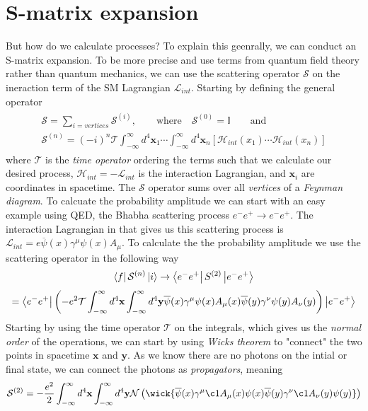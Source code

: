 \documentclass[12pt, a4paper]{book}
\begin{document}
\section{S-matrix expansion}
But how do we calculate processes? To explain this geenrally, we can conduct an S-matrix expansion. To be more precise and use terms from quantum field theory rather than quantum mechanics, we can use the scattering operator $\mathcal{S}$ on the ineraction 
term of the SM Lagrangian $\mathcal{L}_{int}$. Starting by defining the general operator
\begin{align}\label{eq:S-matrix}
    \begin{split}
        \mathcal{S} = \sum_{i = vertices}\mathcal{S}^{(i)},\qquad\text{where}\quad \mathcal{S}^{(0)} = \mathbb{I}\qquad\text{and}\quad \\
        \mathcal{S}^{(n)}=(-i)^n\mathcal{T}\int_{-\infty}^{\infty}d^4\mathbf{x}_1\cdots\int_{-\infty}^{\infty}d^4\mathbf{x}_n\left[\mathcal{H}_{int}(x_1)\cdots\mathcal{H}_{int}(x_n)\right]
    \end{split}
\end{align}
where $\mathcal{T}$ is the \textit{time operator} ordering the terms such that we calculate our desired process, $\mathcal{H}_{int}=-\mathcal{L}_{int}$ is the interaction Lagrangian, and $\mathbf{x}_i$ are coordinates in spacetime.  The $\mathcal{S}$ operator sums over all \textit{vertices} 
of a \textit{Feynman diagram}. To calcuate the probability amplitude we can start with an easy example using QED, the Bhabha scattering process $e^- e^+\rightarrow e^-e^+$. The interaction Lagrangian in that gives us this scattering process is 
$\mathcal{L}_{int} = e\overline{\psi}(x)\gamma^\mu\psi(x)A_\mu$. To calculate the the probability amplitude we use the scattering operator in the following way
$$
\bra{f}\mathcal{S}^{(n)}\ket{i} \rightarrow \bra{e^-e^+}S^{(2)}\ket{e^-e^+} 
$$
$$
= \bra{e^-e^+}\left(-e^2\mathcal{T}\int_{-\infty}^{\infty}d^4\mathbf{x} \int_{-\infty}^{\infty}d^4\mathbf{y} \overline{\psi}(x)\gamma^\mu\psi(x)A_\mu(x)\overline{\psi}(y)\gamma^\nu\psi(y)A_\nu(y) \right)\ket{e^-e^+}
$$
Starting by using the time operator $\mathcal{T}$ on the integrals, which gives us the \textit{normal order} of the operations, we can start by using \textit{Wicks theorem} to "connect" the two points in spacetime $\mathbf{x}$ and $\mathbf{y}$. As we know there are no photons on the intial or final state, we can connect the photons as \textit{propagators}, meaning
$$
\mathcal{S}^{(2)} = -\frac{e^2}{2}\int_{-\infty}^{\infty}d^4\mathbf{x} \int_{-\infty}^{\infty}d^4\mathbf{y} \mathcal{N} \left(\wick{\overline{\psi}(x)\gamma^\mu\c1A_\mu(x)\psi(x)\overline{\psi}(y)\gamma^\nu\c1A_\nu(y)\psi(y)}\right)
$$
\end{document}
